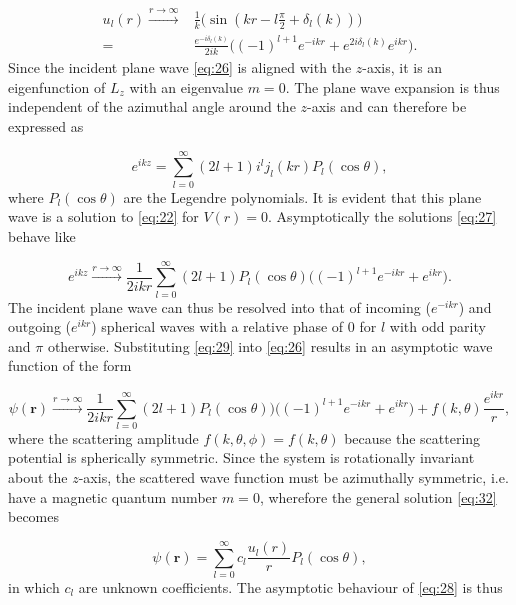 \begin{equation}\label{eq:assympt}
\begin{split}
u_l(r) \xrightarrow{r \to \infty} &\frac{1}{k}\big(\sin(kr - l\frac{\pi}{2} + \delta_l(k))\big)\\
=&\frac{e^{-i\delta_l(k)}}{2ik}\big((-1)^{l+1}e^{-ikr} + e^{2i\delta_l(k)}e^{ikr}\big).
\end{split}
\end{equation}
Since the incident plane wave \eqref{eq:26} is aligned with the $z$-axis, it is an eigenfunction of $L_z$ with an eigenvalue $m=0$. The plane wave expansion is thus independent of the azimuthal angle around the $z$-axis and can therefore be expressed as

\begin{equation}\label{eq:27}
e^{ikz} = \sum_{l=0}^{\infty} (2l+1)i^l j_l(kr)P_l(\cos\theta),
\end{equation}
where $P_l(\cos\theta)$ are the Legendre polynomials. It is evident that this plane wave is a solution to \eqref{eq:22} for $V(r) = 0$. Asymptotically the solutions \eqref{eq:27} behave like

\begin{equation}\label{eq:29}
e^{ikz} \xrightarrow{r \to \infty} \frac{1}{2ikr} \sum_{l=0}^{\infty} (2l+1)P_l(\cos\theta)\big((-1)^{l+1}e^{-ikr} + e^{ikr}\big).
\end{equation}
The incident plane wave can thus be resolved into that of incoming ($e^{-ikr}$) and outgoing ($e^{ikr}$) spherical waves with a relative phase of $0$ for $l$ with odd parity and $\pi$ otherwise. Substituting \eqref{eq:29} into \eqref{eq:26} results in an asymptotic wave function of the form

\begin{equation}\label{eq:30}
\psi(\mathbf{r}) \xrightarrow{r \to \infty} \frac{1}{2ikr}\sum_{l=0}^{\infty} (2l+1)P_l(\cos\theta))\big((-1)^{l+1}e^{-ikr} + e^{ikr}\big) + f(k, \theta) \frac{e^{ikr}}{r},
\end{equation} 
where the scattering amplitude $f(k,\theta,\phi)=f(k,\theta)$ because the scattering potential is spherically symmetric. Since the system is rotationally invariant about the $z$-axis, the scattered wave function must be azimuthally symmetric, i.e. have a magnetic quantum number $m=0$, wherefore the general solution \eqref{eq:32} becomes

\begin{equation}\label{eq:28}
\psi(\mathbf{r}) = \sum_{l=0}^{\infty} c_l \frac{u_l(r)}{r} P_l(\cos\theta),
\end{equation} 
in which $c_l$ are unknown coefficients. The asymptotic behaviour of \eqref{eq:28} is thus

